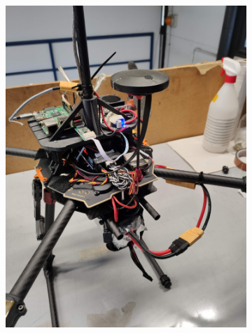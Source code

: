 \begin{figure}[!ht]
\begin{subfigure}[b]{0.45\textwidth}
        \includegraphics[width=\textwidth, angle=-90]{images/drone/IMG_20211105_103729.jpg}
        \caption{}
        \label{fig:auto}
    \end{subfigure}


\end{figure}
